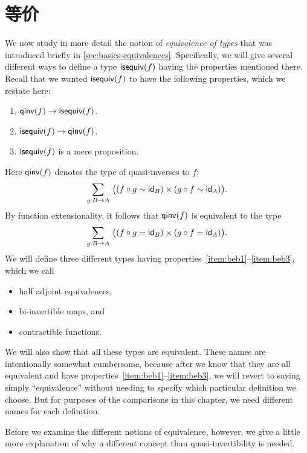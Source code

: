 \chapter{等价}
\label{cha:equivalences}

We now study in more detail the notion of \emph{equivalence of types} that was introduced briefly in \cref{sec:basics-equivalences}.
Specifically, we will give several different ways to define a type $\mathsf{isequiv}(f)$ having the properties mentioned there.
Recall that we wanted $\mathsf{isequiv}(f)$ to have the following properties, which we restate here:
\begin{enumerate}
\item $\mathsf{qinv}(f) \to \mathsf{isequiv} (f)$.\label{item:beb1}
\item $\mathsf{isequiv} (f) \to \mathsf{qinv}(f)$.\label{item:beb2}
\item $\mathsf{isequiv}(f)$ is a mere proposition.\label{item:beb3}
\end{enumerate}
Here $\mathsf{qinv}(f)$ denotes the type of quasi-inverses to $f$:
\begin{equation*}
  \sm{g:B\to A} \big((f \circ g \htpy \idfunc[B]) \times (g\circ f \htpy \idfunc[A])\big).
\end{equation*}
By function extensionality, it follows that $\mathsf{qinv}(f)$ is equivalent to the type
\begin{equation*}
  \sm{g:B\to A} \big((f \circ g = \idfunc[B]) \times (g\circ f = \idfunc[A])\big).
\end{equation*}
We will define three different types having properties~\ref{item:beb1}--\ref{item:beb3}, which we call
\begin{itemize}
\item half adjoint equivalences,
\item bi-invertible maps,
  and
\item contractible functions.
\end{itemize}
We will also show that all these types are equivalent.
These names are intentionally somewhat cumbersome, because after we know that they are all equivalent and have properties~\ref{item:beb1}--\ref{item:beb3}, we will revert to saying simply ``equivalence'' without needing to specify which particular definition we choose.
But for purposes of the comparisons in this chapter, we need different names for each definition.

Before we examine the different notions of equivalence, however, we give a little more explanation of why a different concept than quasi-invertibility is needed.

